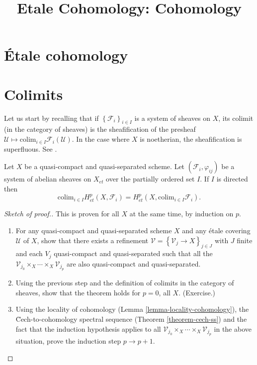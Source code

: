 

%


\title{Etale Cohomology: Cohomology}


\maketitle

\label{section-phantom}

\tableofcontents

\section{\'Etale cohomology}
\label{section-etale-cohomology}


\section{Colimits}
\label{section-colimit}

\noindent
Let us start by recalling that if $\left\{\mathcal{F}_i\right\}_{i\in I}$ is a
system of sheaves on $X$, its colimit (in the category of sheaves) is the
sheafification of the presheaf $\mathcal{U} \mapsto \text{colim}_{i\in I}
\mathcal{F}_i(\mathcal{U})$. In the case where $X$ is noetherian, the
sheafification is superfluous. See \cite{H}.

\begin{theorem}
\label{theorem-colimit}
Let $X$ be a quasi-compact and quasi-separated scheme. Let
$\left(\mathcal{F}_i, \varphi_{ij}\right)$ be a system of abelian sheaves on
$X_{et}$ over the partially ordered set $I$. If $I$ is directed then
$$
\text{colim}_{i\in I} H_{et}^p(X, \mathcal{F}_i) = H_{et}^p(X,
\text{colim}_{i\in I} \mathcal{F}_i).
$$
\end{theorem}

\begin{proof}[Sketch of proof.]
This is proven for all $X$ at the same time, by induction on $p$.
\begin{enumerate}
\item
For any quasi-compact and quasi-separated scheme $X$ and any \'etale covering
$\mathcal{U}$ of $X$, show that there exists a refinement $\mathcal{V}
=\left\{\mathcal{V}_j \to X\right\}_{j\in J}$ with $J$ finite and each $V_j$
quasi-compact and quasi-separated such that all the $\mathcal{V}_{j_0} \times_X
\cdots \times_X \mathcal{V}_{j_p}$ are also quasi-compact and quasi-separated.
\item
Using the previous step and the definition of colimits in the category of
sheaves, show that the theorem holds for $p=0$, all $X$. (Exercise.)
\item
Using the locality of cohomology
(Lemma \ref{lemma-locality-cohomology}),
the \u Cech-to-cohomology spectral sequence
(Theorem \ref{theorem-cech-ss}) and the fact that the induction
hypothesis applies to all $\mathcal{V}_{j_0}\times_X \cdots \times_X
\mathcal{V}_{j_p}$ in the above situation, prove the induction step $p\to p+1$.
\end{enumerate}
\end{proof}

